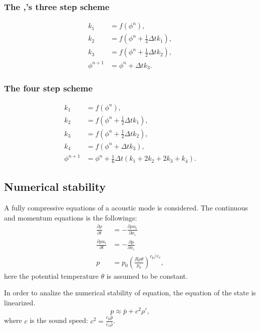 \subsubsection{The \citet{Wicker_Skamarock_2002},'s three step scheme}

\begin{align}
  k_1 &= f(\phi^n), \\
  k_2 &= f\left(\phi^n + \frac{1}{3}\Delta t k_1\right), \\
  k_3 &= f\left(\phi^n + \frac{1}{2}\Delta t k_2\right), \\
  \phi^{n+1} &= \phi^n + \Delta t k_3.
\end{align}


\subsubsection{The four step scheme}

\begin{align}
  k_1 &= f(\phi^n), \\
  k_2 &= f\left(\phi^n + \frac{1}{2}\Delta t k_1\right), \\
  k_3 &= f\left(\phi^n + \frac{1}{2}\Delta t k_2\right), \\
  k_4 &= f\left(\phi^n + \Delta t k_3\right), \\
  \phi^{n+1} &= \phi^n + \frac{1}{6}\Delta t (k_1 + 2k_2 + 2k_3 + k_4).
\end{align}


\subsection{Numerical stability}

A fully compressive equations of a acoustic mode is considered.
The continuous and momentum equations is the followings:
\begin{align}
  \frac{\partial \rho}{\partial t} &=
  - \frac{\partial \rho u_i}{\partial x_i} \\
  \frac{\partial \rho u_i}{\partial t} &=
  - \frac{\partial p}{\partial x_i} \\
  p &= p_0 \left( \frac{R \rho \theta}{p_0} \right)^{c_p/c_v},
\end{align}
here the potential temperature $\theta$ is assumed to be constant.

In order to analize the numerical stability of equation, the equation of the state is linearized.
\begin{equation}
  p \approx \bar{p} + c^2 \rho',
\end{equation}
where $c$ is the sound speed: $c^2=\frac{c_p\bar{p}}{c_v\bar{\rho}}$.


